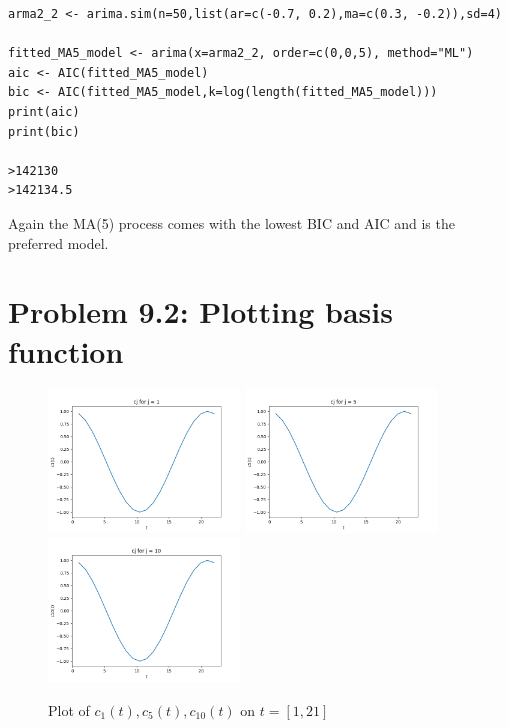 \documentclass[11pt, oneside]{article}   	%
\begin{document}
\begin{lstlisting}
arma2_2 <- arima.sim(n=50,list(ar=c(-0.7, 0.2),ma=c(0.3, -0.2)),sd=4)

fitted_MA5_model <- arima(x=arma2_2, order=c(0,0,5), method="ML")
aic <- AIC(fitted_MA5_model)
bic <- AIC(fitted_MA5_model,k=log(length(fitted_MA5_model)))
print(aic)
print(bic)

>142130
>142134.5
\end{lstlisting}
Again the MA(5) process comes with the lowest BIC and AIC and is the preferred model.

\section{Problem 9.2: Plotting basis function}
\begin{figure}[H] %
   \centering
   \includegraphics[width=2in]{cj1} 
    \includegraphics[width=2in]{cj5} 
     \includegraphics[width=2in]{cj10} 
   \caption{Plot of $c_{1}(t), c_{5}(t), c_{10}(t)$ on $t=[1,21]$}
   \label{fig:cj}
\end{figure}
\end{document}
